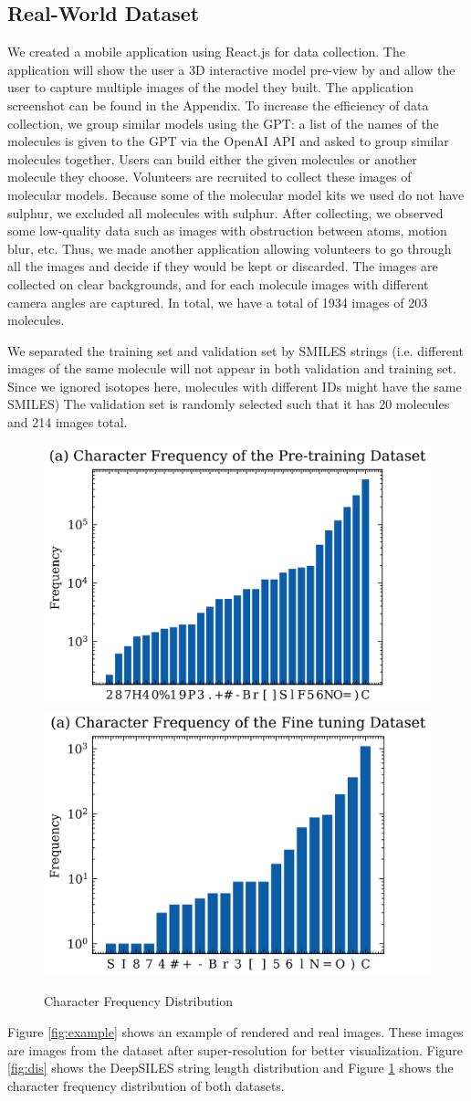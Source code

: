 \documentclass[12pt]{article}
\begin{document}
\subsection{Real-World Dataset}
We created a mobile application using React.js for data collection. The application will show the user a 3D interactive model pre-view by \autocite{rego_3dmoljs_2015} and allow the user to capture multiple images of the model they built. The application screenshot can be found in the Appendix. To increase the efficiency of data collection, we group similar models using the GPT: a list of the names of the molecules is given to the GPT via the OpenAI API and asked to group similar molecules together. Users can build either the given molecules or another molecule they choose. Volunteers are recruited to collect these images of molecular models. Because some of the molecular model kits we used do not have sulphur, we excluded all molecules with sulphur. After collecting, we observed some low-quality data such as images with obstruction between atoms, motion blur, etc. Thus, we made another application allowing volunteers to go through all the images and decide if they would be kept or discarded. The images are collected on clear backgrounds, and for each molecule images with different camera angles are captured. In total, we have a total of 1934 images of 203 molecules. 

We separated the training set and validation set by SMILES strings (i.e. different images of the same molecule will not appear in both validation and training set. Since we ignored isotopes here, molecules with different IDs might have the same SMILES) The validation set is randomly selected such that it has 20 molecules and 214 images total. 

\begin{figure}
    \centering
    \includegraphics[width=0.4\linewidth]{freq1.png}
    \includegraphics[width=0.4\linewidth]{freq2.png}
    \caption{Character Frequency Distribution}
    \label{chardis}
\end{figure}
Figure \ref{fig:example} shows an example of rendered and real images. These images are images from the dataset after super-resolution for better visualization. Figure \ref{fig:dis} shows the DeepSILES string length distribution and Figure \ref{chardis} shows the character frequency distribution of both datasets. 
\end{document}
